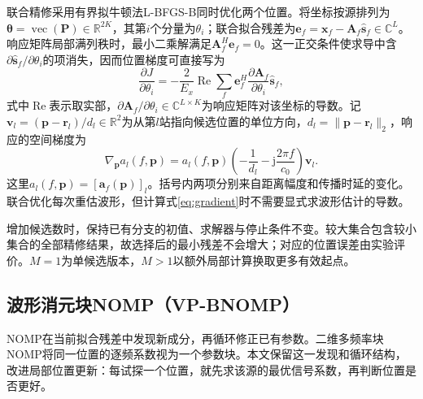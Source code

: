 \documentclass[a4paper,fleqn]{cas-sc}
\numberwithin{equation}{section}
\numberwithin{figure}{section}
\numberwithin{table}{section}
\newcommand{\R}{\mathbb R}
\newcommand{\C}{\mathbb C}
\newcommand{\Rea}{\operatorname{Re}}
\begin{document}
联合精修采用有界拟牛顿法L-BFGS-B同时优化两个位置\cite{Byrd1995}。将坐标按源排列为$\bm\theta=\operatorname{vec}(\bm P)\in\R^{2K}$，其第$i$个分量为$\theta_i$；联合拟合残差为$\bm e_f=\bm x_f-\bm A_f\widehat{\bm s}_f\in\C^L$。响应矩阵局部满列秩时，最小二乘解满足$\bm A_f^H\bm e_f=0$。这一正交条件使求导中含$\partial\widehat{\bm s}_f/\partial\theta_i$的项消失，因而位置梯度可直接写为\cite{GolubPereyra1973}
\begin{equation}
 \frac{\partial J}{\partial\theta_i}
 =-\frac{2}{E_x}\Rea\sum_f
 \bm e_f^H\frac{\partial\bm A_f}{\partial\theta_i}
 \widehat{\bm s}_f,\label{eq:gradient}
\end{equation}
式中$\Rea$表示取实部，$\partial\bm A_f/\partial\theta_i\in\C^{L\times K}$为响应矩阵对该坐标的导数。记$\bm v_l=(\bm p-\bm r_l)/d_l\in\R^2$为从第$l$站指向候选位置的单位方向，$d_l=\|\bm p-\bm r_l\|_2$，响应的空间梯度为
\begin{equation}
 \nabla_{\bm p}a_l(f,\bm p)
 =a_l(f,\bm p)\left(-\frac1{d_l}-\mathrm j\frac{2\pi f}{c_0}\right)\bm v_l.
 \label{eq:responseDerivative}
\end{equation}
这里$a_l(f,\bm p)=[\bm a_f(\bm p)]_l$。括号内两项分别来自距离幅度和传播时延的变化。联合优化每次重估波形，但计算式\eqref{eq:gradient}时不需要显式求波形估计的导数。

增加候选数时，保持已有分支的初值、求解器与停止条件不变。较大集合包含较小集合的全部精修结果，故选择后的最小残差不会增大；对应的位置误差由实验评价。$M=1$为单候选版本，$M>1$以额外局部计算换取更多有效起点。

\subsection{波形消元块NOMP（VP-BNOMP）}\label{sec:vpnomp}
NOMP在当前拟合残差中发现新成分，再循环修正已有参数\cite{Mamandipoor2016}。二维多频率块NOMP将同一位置的逐频系数视为一个参数块\cite{Yang2022}。本文保留这一发现和循环结构，改进局部位置更新：每试探一个位置，就先求该源的最优信号系数，再判断位置是否更好。
\end{document}
